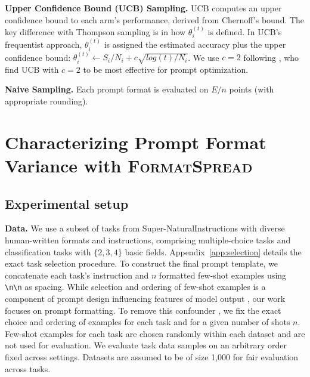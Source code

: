 \documentclass{article} %
\newcommand{\tbdone}[1]{}
\renewcommand{\tbdone}[1]{{\color{black}{#1}}}  %
\renewcommand{\paragraph}[1]{\textbf{#1}}
\newcommand{\toolname}[1]{}
\renewcommand{\toolname}[1]{{\color{black} \textsc{FormatSpread}}}
\begin{document}
\paragraph{Upper Confidence Bound (UCB) Sampling.} UCB \citep{lai1985asymptotically} computes an upper confidence bound to each arm's performance, derived from Chernoff's bound. The key difference with Thompson sampling is in how $\theta_i^{(t)}$ is defined. %
In UCB's frequentist approach, $\theta_i^{(t)}$ is assigned the estimated accuracy plus the upper confidence bound: $\theta_i^{(t)}\!\gets\!S_i / N_i + c \sqrt{log(t) / N_i}$. 
We use $c=2$ following \cite{pryzant2023automatic}, who find UCB with $c=2$ to be most effective for prompt optimization. %

\paragraph{Naive Sampling.} Each prompt format is evaluated on $E/n$ points (with appropriate rounding).

\vspace{-1mm}
\section{Characterizing Prompt Format Variance with \toolname{}}
\vspace{-1mm}
\subsection{Experimental setup}
\paragraph{Data.} We use a subset of \tbdone{53} tasks from Super-NaturalInstructions \citep{wang2022super} with diverse human-written formats and instructions,
comprising \tbdone{19} multiple-choice tasks and \tbdone{34} classification tasks with $\{2,3, 4\}$ basic fields.
Appendix~\ref{app:selection} details the exact task selection procedure.
To construct the final prompt template, we concatenate each task's instruction and $n$ formatted few-shot examples using \texttt{\textbackslash n\textbackslash n} as spacing. %
While selection and ordering of few-shot examples is a component of prompt design influencing features of model output \citep{lu2021fantastically}, our work focuses on prompt formatting.
To remove this confounder%
, we fix the exact choice and ordering of examples for each task and for a given number of shots $n$. Few-shot examples for each task are chosen randomly within each dataset %
and are not used for evaluation. 
We evaluate task data samples on an arbitrary order fixed across settings. 
Datasets are assumed to be of size 1,000 for fair evaluation across tasks.
\end{document}
